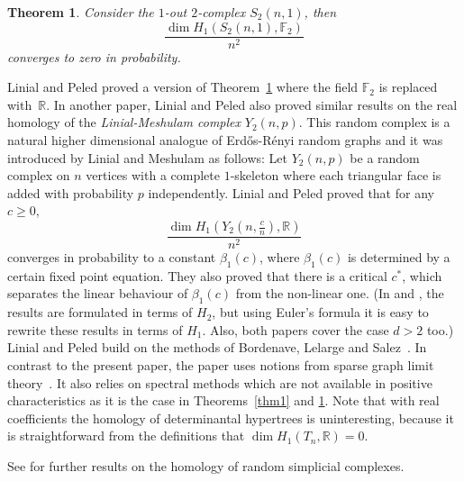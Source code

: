 \documentclass[11pt,a4paper]{article}
\theoremstyle{plain}
\newtheorem{theorem}{Theorem}[section]
\theoremstyle{definition}
\begin{document}
\begin{theorem}\label{thm2}
Consider the $1$-out $2$-complex $S_2(n,1)$, then   
    \[\frac{\dim H_1(S_2(n,1),\mathbb{F}_2)}{n^2}\]
    converges to zero in probability.
\end{theorem}





Linial and Peled \cite{linial2019enumeration} proved a version of Theorem~\ref{thm2} where the field $\mathbb{F}_2$ is replaced with~$\mathbb{R}$. In another paper,  Linial and Peled \cite{linial2016phase} also  proved similar results on the real homology of the \emph{Linial-Meshulam complex} $Y_2(n,p)$. This random complex is a natural higher dimensional analogue of  Erd\H{o}s-R\'enyi random graphs and it was introduced by Linial and Meshulam \cite{linial2006homological} as follows: Let $Y_2(n,p)$ be a random complex on $n$ vertices with a complete $1$-skeleton where each triangular face is added with probability $p$ independently. Linial and Peled \cite{linial2016phase} proved that for any $c\ge 0$,
\[\frac{\dim H_1\left(Y_2\left(n,\frac{c}n\right),\mathbb{R}\right)}{n^2}\]
converges in probability to a constant $\beta_1(c)$, where $\beta_1(c)$ is determined by a certain fixed point equation. They also proved that there is a critical $c^*$, which separates the linear behaviour of $\beta_1(c)$ from the non-linear one. (In \cite{linial2019enumeration} and \cite{linial2016phase}, the results are formulated in terms of $H_2$, but using Euler's formula it is easy to rewrite these results in terms of $H_1$. Also, both papers cover the case $d>2$ too.)  Linial and  Peled build on the methods of Bordenave, Lelarge and Salez~\cite{bordenave2011rank}. In contrast to the present paper,  the paper \cite{bordenave2011rank} uses notions from sparse graph limit theory~\cite{aldous2016processes,lovasz2012large}. It also relies on spectral methods which are not available in positive characteristics as it is the case in Theorems~\ref{thm1} and \ref{thm2}. Note that  with real coefficients the homology of determinantal hypertrees is uninteresting, because it is straightforward from the definitions that $\dim H_1(T_n,\mathbb{R})=0$.  

See \cite{rc1,rc2,rc3,rc4,rc5,rc6,rc7,rc8,rc9,rc10} for further results on the homology of random simplicial complexes. 
\end{document}
